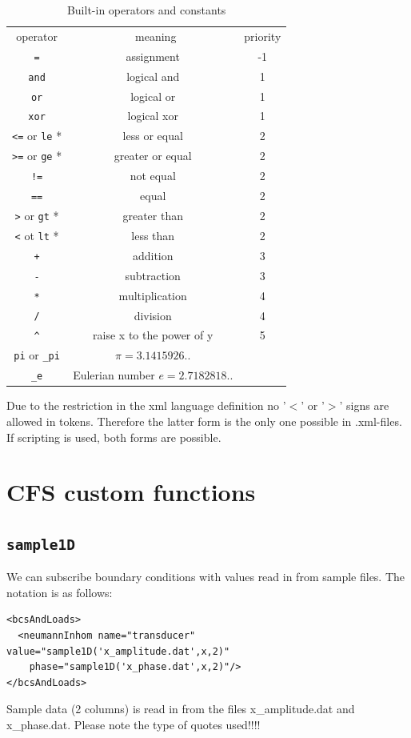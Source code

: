 \begin{table}[ht]
  \begin{longtable}{c|c|c}
    \hline\noalign{\smallskip}
    operator & \ meaning & priority \\
    \noalign{\smallskip}\hline\noalign{\smallskip}
    \verb#=#                  & assignment      & -1 \\
    \verb#and#                & logical and      & 1 \\
    \verb#or#                 & logical or       & 1 \\
    \verb#xor#                & logical xor      & 1 \\
    \verb#<=# or \verb#le# *  & less or equal    & 2 \\
    \verb#>=# or \verb#ge# *  & greater or equal & 2 \\
    \verb#!=#                 & not equal        & 2 \\
    \verb#==#                 & equal            & 2 \\
    \verb#># or \verb#gt# *   & greater than     & 2 \\
    \verb#<# ot \verb#lt# *   & less than        & 2 \\
    \verb#+#                  & addition         & 3 \\
    \verb#-#                  & subtraction      & 3 \\
    \verb#*#                  & multiplication   & 4 \\
    \verb#/#                  & division         & 4 \\
    \verb#^#                  & raise x to the power of y & 5 \\
    \verb#pi#   or \verb#_pi# & $\pi = 3.1415926..$ & \\
    \verb#_e#                 & Eulerian number $e = 2.7182818..$ 
  \end{longtable}
  \vspace*{0.5cm}
  {\footnotesize * Due to the restriction in the xml language definition no '$<$' or
    '$>$' signs are allowed in tokens. Therefore the latter form is the
    only one possible in .xml-files. If scripting is used, both forms are
    possible. }
 \caption{Built-in operators and constants}  
\end{table}
\clearpage
\section{CFS custom functions}
\subsection{\texttt{sample1D}}
We can subscribe boundary conditions with values read in from sample files.
The notation is as follows:
\begin{verbatim}
<bcsAndLoads>
  <neumannInhom name="transducer" value="sample1D('x_amplitude.dat',x,2)"
    phase="sample1D('x_phase.dat',x,2)"/>
</bcsAndLoads>
\end{verbatim}
Sample data (2 columns) is read in from the files x\_amplitude.dat and x\_phase.dat.
Please note the type of quotes used!!!!
\newline

